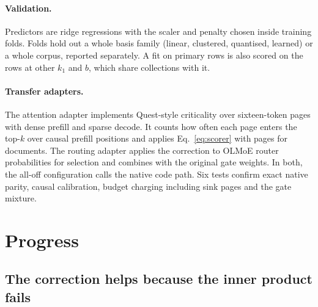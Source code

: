 \documentclass[11pt]{article}
\begin{document}
\paragraph{Validation.} Predictors are ridge regressions with the scaler and penalty chosen
inside training folds. Folds hold out a whole basis family (linear, clustered, quantised,
learned) or a whole corpus, reported separately. A fit on primary rows is also scored on
the rows at other $k_1$ and $b$, which share collections with it.

\paragraph{Transfer adapters.} The attention adapter implements Quest-style criticality
over sixteen-token pages with dense prefill and sparse decode. It counts how often each
page enters the top-$k$ over causal prefill positions and applies Eq.~\eqref{eq:scorer}
with pages for documents. The routing adapter applies the correction to OLMoE router
probabilities for selection and combines with the original gate weights. In both, the
all-off configuration calls the native code path. Six tests confirm exact native parity,
causal calibration, budget charging including sink pages and the gate mixture.

\section{Progress}
\label{sec:progress}

\subsection{The correction helps because the inner product fails}
\end{document}
